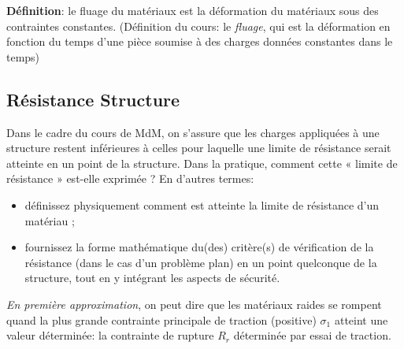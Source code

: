 \documentclass[a4paper]{article}
\begin{document}
\textbf{Définition}: le fluage du matériaux est la déformation du matériaux sous des contraintes constantes. (Définition du cours: le \emph{fluage}, qui est la déformation en fonction du temps d'une pièce soumise  à des charges données constantes dans le temps)





\subsection{Résistance Structure}





\begin{siderules}
Dans le cadre du cours de MdM, on s’assure que les charges appliquées à une structure restent
inférieures à celles pour laquelle une limite de résistance serait atteinte en un point de la structure.
Dans la pratique, comment cette « limite de résistance » est-elle exprimée ? En d’autres termes:
\begin{itemize}
    \item définissez physiquement comment est atteinte la limite de résistance d’un matériau ;
    \item fournissez la forme mathématique du(des) critère(s) de vérification de la résistance (dans le cas d’un problème plan) en un point quelconque de la structure, tout en y intégrant les aspects de sécurité.
\end{itemize}
\end{siderules}



\emph{En première approximation}, on peut dire que les matériaux raides se rompent quand la plus grande contrainte principale de traction (positive) $ \sigma_1 $ atteint une valeur déterminée: la contrainte de rupture $ R_r $ déterminée par essai de traction.
\end{document}
